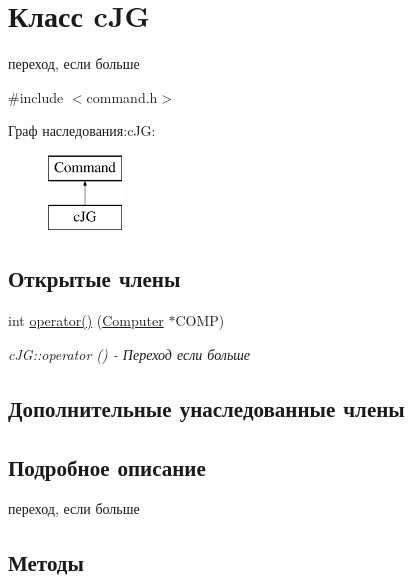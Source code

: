 \hypertarget{classc_j_g}{}\section{Класс c\+JG}
\label{classc_j_g}


переход, если больше  




{\ttfamily \#include $<$command.\+h$>$}

Граф наследования\+:c\+JG\+:\begin{figure}[H]
\begin{center}
\leavevmode
\includegraphics[height=2.000000cm]{classc_j_g}
\end{center}
\end{figure}
\subsection*{Открытые члены}
\begin{DoxyCompactItemize}
\item 
int \hyperlink{classc_j_g_a3e2f3b6fc18af11c937a81e83b065ede}{operator()} (\hyperlink{class_computer}{Computer} $\ast$C\+O\+MP)
\begin{DoxyCompactList}\small\item\em c\+J\+G\+::operator () -\/ Переход если больше \end{DoxyCompactList}\end{DoxyCompactItemize}
\subsection*{Дополнительные унаследованные члены}


\subsection{Подробное описание}
переход, если больше 

\subsection{Методы}
\hypertarget{classc_j_g_a3e2f3b6fc18af11c937a81e83b065ede}{}\label{classc_j_g_a3e2f3b6fc18af11c937a81e83b065ede} 
